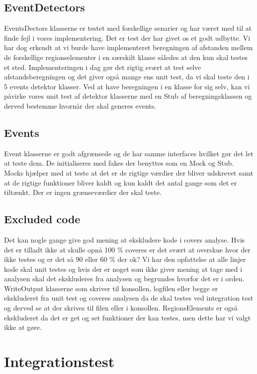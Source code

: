 \subsection{EventDetectors}
EventsDectors klasserne er testet med forskellige senarier og har været med til at finde fejl i vores implementering. Det er test der har givet os et godt udbytte. Vi har dog erkendt at vi burde have implementeret beregningen af afstanden mellem de forskellige regionselementer i en særskilt klasse således at den kun skal testes et sted. Implementeringen i dag gør det rigtig svært at test selve afstandsberegningen og det giver også mange ens unit test, da vi skal teste den i 5 events detektor klasser. Ved at have beregningen i en klasse for sig selv, kan vi påvirke vores unit test af detektor klasserne med en Stub af beregningsklassen og derved bestemme hvornår der skal generes events.

\subsection{Events}
Event klasserne er godt afgrænsede og de har samme interfaces hvilket gør det let at teste dem. De initialiseres med fakes der benyttes som en Mock og Stub. Mocks hjælper med at teste at det er de rigtige værdier der bliver udskrevet samt at de rigtige funktioner bliver kaldt og kun kaldt det antal gange som det er tiltænkt. Der er ingen grænseværdier der skal teste.

\subsection{Excluded code}
Det kan nogle gange give god mening at ekskludere kode i covers analyse. Hvis det er tilladt ikke at skulle opnå 100 \% coveres er det svært at overskue hvor der ikke testes og er det så 90 eller 60 \% der ok? Vi har den opfattelse at alle linjer kode skal unit testes og hvis der er noget som ikke giver mening at tage med i analysen skal det ekskluderes fra analysen og begrundes hvorfor det er i orden.
WriteOutput klasserne som skriver til konsollen, logfilen eller begge er ekskluderet fra unit test og coveres analysen da de skal testes ved integration test og derved se at der skrives til filen eller i konsollen. 
RegionsElements er også ekskluderet da det er get og set funktioner der kan testes, men dette har vi valgt ikke at gøre.

\section{Integrationstest}

